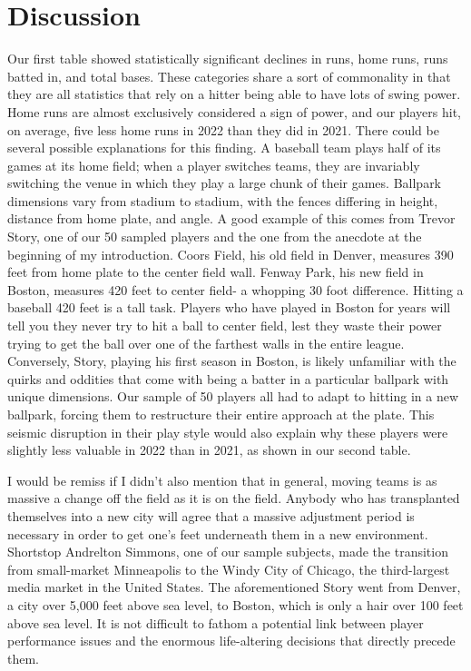 \documentclass[10pt]{article}
\begin{document}
\section{Discussion}

Our first table showed statistically significant declines in runs, home runs, runs batted in, and total bases. These categories 
share a sort of commonality in that they are all statistics that rely on a hitter being able to have lots of swing power. Home 
runs are almost exclusively considered a sign of power, and our players hit, on average, five less home runs in 2022 than they 
did in 2021. There could be several possible explanations for this finding. A baseball team plays half of its games at its home 
field; when a player switches teams, they are invariably switching the venue in which they play a large chunk of their games. 
Ballpark dimensions vary from stadium to stadium, with the fences differing in height, distance from home plate, and angle. A 
good example of this comes from Trevor Story, one of our 50 sampled players and the one from the anecdote at the beginning of 
my introduction. Coors Field, his old field in Denver, measures 390 feet from home plate to the center field wall. Fenway Park, 
his new field in Boston, measures 420 feet to center field- a whopping 30 foot difference. Hitting a baseball 420 feet is a 
tall task. Players who have played in Boston for years will tell you they never try to hit a ball to center field, lest they 
waste their power trying to get the ball over one of the farthest walls in the entire league. Conversely, Story, playing his 
first season in Boston, is likely unfamiliar with the quirks and oddities that come with being a batter in a particular ballpark 
with unique dimensions. Our sample of 50 players all had to adapt to hitting in a new ballpark, forcing them to restructure 
their entire approach at the plate. This seismic disruption in their play style would also explain why these players were 
slightly less valuable in 2022 than in 2021, as shown in our second table. 

I would be remiss if I didn’t also mention that in general, moving teams is as massive a change off the field as it is on the 
field. Anybody who has transplanted themselves into a new city will agree that a massive adjustment period is necessary in 
order to get one’s feet underneath them in a new environment. Shortstop Andrelton Simmons, one of our sample subjects, made 
the transition from small-market Minneapolis to the Windy City of Chicago, the third-largest media market in the United States. 
The aforementioned Story went from Denver, a city over 5,000 feet above sea level, to Boston, which is only a hair over 100 
feet above sea level. It is not difficult to fathom a potential link between player performance issues and the enormous 
life-altering decisions that directly precede them. 
\end{document}
